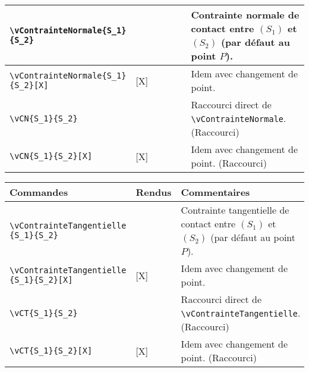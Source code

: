 \documentclass[a4paper,12pt]{article}
\newcommand{\rac}{({\color{red}Raccourci})}
\begin{document}
\begin{tabular}{|p{0.4\linewidth}|p{0.2\linewidth}|p{0.4\linewidth}|}
			\\\hline
				\verb!\vContrainteNormale{S_1}! \verb!{S_2}!			&	\vContrainteNormale{S_1}{S_2}		&	Contrainte normale de contact entre $(S_1)$ et $(S_2)$ (par défaut au point $P$).
			\\\hline
				\verb!\vContrainteNormale{S_1}! \verb!{S_2}[X]!		&	\vContrainteNormale{S_1}{S_2}[X]	&	Idem avec changement de point.
			\\\hline
				\verb!\vCN{S_1}{S_2}!						&	\vCN{S_1}{S_2}				&	Raccourci direct de \verb!\vContrainteNormale!. \rac
			\\\hline
				\verb!\vCN{S_1}{S_2}[X]!					&	\vCN{S_1}{S_2}[X]			&	Idem avec changement de point. \rac
			\\\hline
		\end{tabular}

		\noindent
		\begin{tabular}{|p{0.4\linewidth}|p{0.2\linewidth}|p{0.4\linewidth}|}
			\hline
				\textbf{Commandes}&\textbf{Rendus}&\textbf{Commentaires}
			\\\hline\hline
				\verb!\vContrainteTangentielle! \verb!{S_1}{S_2}!		&	\vContrainteTangentielle{S_1}{S_2}	&	Contrainte tangentielle de contact entre $(S_1)$ et $(S_2)$ (par défaut au point $P$).
			\\\hline
				\verb!\vContrainteTangentielle! \verb!{S_1}{S_2}[X]!		&	\vContrainteTangentielle{S_1}{S_2}[X]	&	Idem avec changement de point.
			\\\hline
				\verb!\vCT{S_1}{S_2}!						&	\vCT{S_1}{S_2}				&	Raccourci direct de \verb!\vContrainteTangentielle!. \rac
			\\\hline
				\verb!\vCT{S_1}{S_2}[X]!					&	\vCT{S_1}{S_2}[X]			&	Idem avec changement de point. \rac
			\\\hline	
		\end{tabular}
\end{document}
